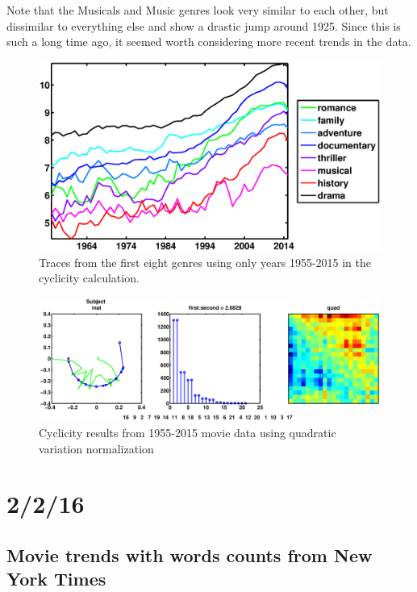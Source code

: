 \documentclass[11pt]{article}
\begin{document}
Note that the Musicals and Music genres look very similar to each other, but dissimilar to everything else and show a drastic jump around 1925. Since this is such a long time ago, it seemed worth considering more recent trends in the data.
\begin{figure}[H]
\begin{minipage}{.3\textwidth}
\end{minipage}
\hfill
\begin{minipage}{.6\textwidth}
\includegraphics[width=\textwidth]{pictures/movie_data_1955-2015.eps}
\caption{Traces from the first eight genres using only years 1955-2015 in the cyclicity calculation.}
\end{minipage}
\end{figure}
\begin{figure}[H]
\centering
\includegraphics[trim= 130 0 130 0, clip, width=\textwidth]{pictures/movie_data_1955-2015_QC.eps}
\caption{Cyclicity results from 1955-2015 movie data using quadratic variation normalization}
\end{figure}

\section{2/2/16}
\subsection{Movie trends with words counts from New York Times}
\end{document}
